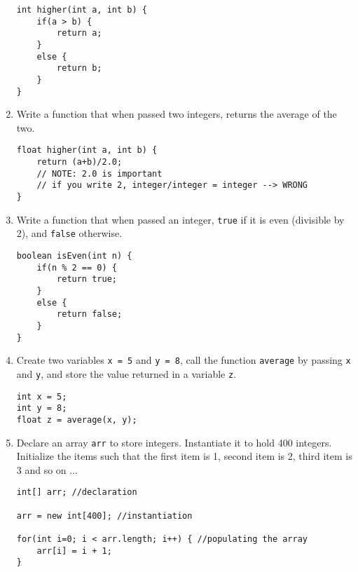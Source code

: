 \begin{questions}
\begin{enumerate}
\begin{solution}
\begin{lstlisting}
int higher(int a, int b) {
	if(a > b) {
		return a;
	}
	else {
		return b;
	}
}
\end{lstlisting}
\end{solution}

\item Write a function that when passed two integers, returns the average of the two.
\begin{solution}
\begin{lstlisting}
float higher(int a, int b) {
	return (a+b)/2.0; 
	// NOTE: 2.0 is important
	// if you write 2, integer/integer = integer --> WRONG
}
\end{lstlisting}
\end{solution}

\item Write a function that when passed an integer, \texttt{true} if it is even (divisible by 2), and \texttt{false} otherwise.
\begin{solution}
\begin{lstlisting}
boolean isEven(int n) {
	if(n % 2 == 0) {
		return true;
	}
	else {
		return false;
	}
}
\end{lstlisting}	
\end{solution}

\item Create two variables \texttt{x = 5} and \texttt{y = 8}, call the function \texttt{average} by passing \texttt{x} and \texttt{y}, and store the value returned in a variable \texttt{z}.
\begin{solution}
\begin{lstlisting}
int x = 5;
int y = 8;
float z = average(x, y);
\end{lstlisting}
\end{solution}

\item Declare an array \texttt{arr} to store integers. Instantiate it to hold 400 integers. Initialize the items such that the first item is 1, second item is 2, third item is 3 and so on ...

\begin{solution}
\begin{lstlisting}
int[] arr; //declaration

arr = new int[400]; //instantiation

for(int i=0; i < arr.length; i++) { //populating the array
	arr[i] = i + 1;
}
\end{lstlisting}
\end{solution}


\end{enumerate}
\end{questions}

